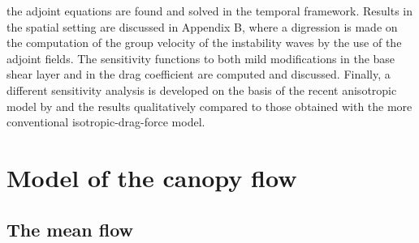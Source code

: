the adjoint equations are found and solved in the temporal framework. Results in the spatial setting
are discussed in Appendix B, where a digression is made on the computation of the group velocity
of the instability waves by the use of the adjoint fields. The sensitivity functions to both mild
modifications in the base shear layer and in the drag coefficient are computed and discussed. Finally,
a different sensitivity analysis is developed on the basis of the recent anisotropic model by \citet{zampogna2016instability} and the results qualitatively compared to those obtained with the more conventional
isotropic-drag-force model.



\section{Model of the canopy flow}
\label{sec:2ch3}

\subsection{The mean flow}


